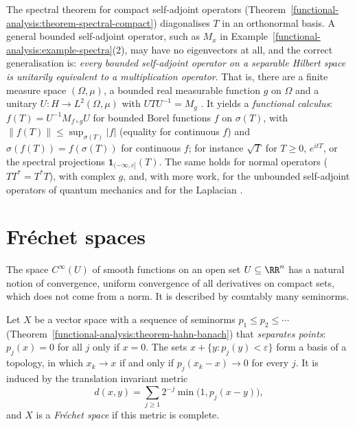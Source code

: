 \begin{remark}\label{functional-analysis:remark-spectral-theorem}
The spectral theorem for compact self-adjoint operators (Theorem~\ref{functional-analysis:theorem-spectral-compact}) diagonalises $T$ in an orthonormal basis. A general bounded self-adjoint operator, such as
$M_x$ in Example~\ref{functional-analysis:example-spectra}(2), may have no eigenvectors at all, and the correct generalisation is: \emph{every bounded self-adjoint operator on a separable Hilbert space is unitarily
equivalent to a multiplication operator}. That is, there are a finite measure space $(\Omega, \mu)$, a bounded real measurable function $g$ on $\Omega$ and a unitary $U \colon H \to L^2(\Omega, \mu)$ with
$UTU^{-1} = M_g$ \cite[Chapter VII]{reed-simon-1}. It yields a \emph{functional calculus}: $f(T) = U^{-1}M_{f \circ g}U$ for bounded Borel functions $f$ on $\sigma(T)$, with $\|f(T)\| \leq \sup_{\sigma(T)}|f|$ (equality
for continuous $f$) and $\sigma(f(T)) = f(\sigma(T))$ for continuous $f$; for instance $\sqrt{T}$ for $T \geq 0$, $e^{itT}$, or the spectral projections $\mathbf{1}_{(-\infty, c]}(T)$. The same holds for normal operators
($TT^* = T^*T$), with complex $g$, and, with more work, for the unbounded self-adjoint operators of quantum mechanics and for the Laplacian \cite[Chapter VIII]{reed-simon-1}.
\end{remark}

\section{Fr\'echet spaces}\label{functional-analysis:section-frechet}

The space $C^\infty(U)$ of smooth functions on an open set $U \subseteq \RR^n$ has a natural notion of convergence, uniform convergence of all derivatives on compact sets, which does not come from a
norm. It is described by countably many seminorms.

\begin{definition}\label{functional-analysis:definition-frechet}
Let $X$ be a vector space with a sequence of seminorms $p_1 \leq p_2 \leq \cdots$ (Theorem~\ref{functional-analysis:theorem-hahn-banach}) that \emph{separates points}: $p_j(x) = 0$ for all $j$ only if
$x = 0$. The sets $x + \{y : p_j(y) < \varepsilon\}$ form a basis of a topology, in which $x_k \to x$ if and only if $p_j(x_k - x) \to 0$ for every $j$. It is induced by the translation invariant metric
\[
d(x, y) = \sum_{j \geq 1}2^{-j}\min\bigl(1, p_j(x - y)\bigr),
\]
and $X$ is a \emph{Fr\'echet space} if this metric is complete.
\end{definition}

